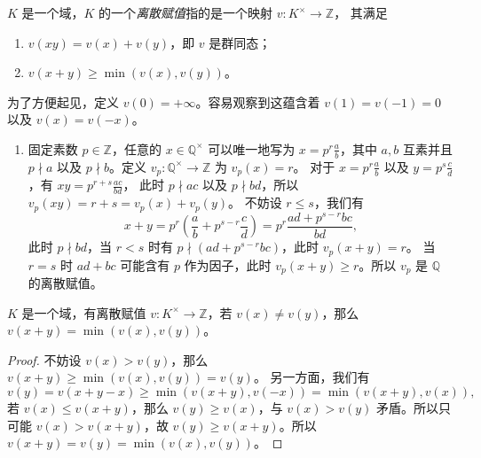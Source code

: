$K$ 是一个域，$K$ 的一个\emph{离散赋值}指的是一个映射 $v:K^\times\to\mathbb{Z}$，
其满足
\begin{enumerate}
  \item $v(xy)=v(x)+v(y)$，即 $v$ 是群同态；
  \item $v(x+y)\geq\min(v(x),v(y))$。
\end{enumerate}
为了方便起见，定义 $v(0)=+\infty$。容易观察到这蕴含着 $v(1)=v(-1)=0$ 以及
$v(x)=v(-x)$。

\begin{example}
  \mbox{}
  \begin{enumerate}
    \item 固定素数 $p\in\mathbb{Z}$，任意的 $x\in\mathbb{Q}^\times$ 可以唯一地写为
    $x=p^r\frac{a}{b}$，其中 $a,b$ 互素并且 $p\nmid a$ 以及 $p\nmid b$。定义
    $v_p:\mathbb{Q}^\times \to\mathbb{Z}$ 为 $v_p(x)=r$。
    对于 $x=p^r\frac{a}{b}$ 以及 $y=p^s\frac{c}{d}$，有 $xy=p^{r+s}\frac{ac}{bd}$，
    此时 $p\nmid ac$ 以及 $p\nmid bd$，所以 $v_p(xy)=r+s=v_p(x)+v_p(y)$。
    不妨设 $r\leq s$，我们有
    \[
      x+y=p^r\left(\frac{a}{b}+p^{s-r}\frac{c}{d}\right)=p^r\frac{ad+p^{s-r}bc}{bd}  ,
    \]
    此时 $p\nmid bd$，当 $r<s$ 时有 $p\nmid (ad+p^{s-r}bc)$，此时 $v_p(x+y)=r$。
    当 $r=s$ 时 $ad+bc$ 可能含有 $p$ 作为因子，此时 $v_p(x+y)\geq r$。所以
    $v_p$ 是 $\mathbb{Q}$ 的离散赋值。
  \end{enumerate}
\end{example}

\begin{lemma}
  $K$ 是一个域，有离散赋值 $v:K^\times\to\mathbb{Z}$，若 $v(x)\neq v(y)$，那么
  $v(x+y)=\min(v(x),v(y))$。
\end{lemma}
\begin{proof}
  不妨设 $v(x)>v(y)$，那么 $v(x+y)\geq \min(v(x),v(y))=v(y)$。
  另一方面，我们有
  \[
    v(y)=v(x+y-x)\geq \min(v(x+y),v(-x))=  \min(v(x+y),v(x)),
  \]
  若 $v(x)\leq v(x+y)$，那么 $v(y)\geq v(x)$，与 $v(x)>v(y)$ 矛盾。所以只可能
  $v(x)>v(x+y)$，故 $v(y)\geq v(x+y)$。所以 $v(x+y)=v(y)=\min(v(x),v(y))$。
\end{proof}


